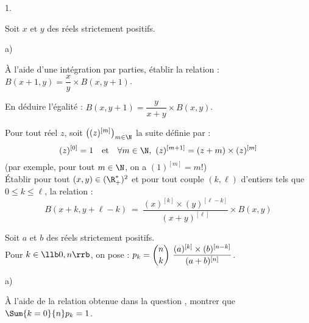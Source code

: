 \documentclass[11pt]{article}%
\begin{document}




\begin{noliste}{1.}
  \setlength{\itemsep}{4mm} %
  \setcounter{enumi}{4}
\item Soit $x$ et $y$ des réels strictement positifs.
  \begin{noliste}{a)}
    \setlength{\itemsep}{2mm}
  \item À l'aide d'une intégration par parties, établir la relation :
    $B(x+1,y) = \dfrac{x}{y} \times B(x,y+1)$.
    
    




  \item En déduire l'égalité : $B(x,y+1) = \dfrac{y}{x+y} \times
    B(x,y)$.

    

  \end{noliste}
  
\item Pour tout réel $z$, soit $\left( (z)^{[m]} \right)_{m \in \N}$
  la suite définie par :
  \[
  (z)^{[0]}=1 \quad \text{et} \quad \forall m \in \N, \ 
  (z)^{[m+1]}=(z+m)   \times (z)^{[m]}
  \]
  (par exemple, pour tout $m \in \N$, on a $(1)^{[m]}=m!$)\\[.1cm]
  Établir pour tout $(x,y) \in (\R_+^*)^2$ et pour tout 
  couple $(k, \ell)$ d'entiers tels que $0 \leq k \leq \ell$, la 
  relation :
  \[
  B(x+k, y+\ell-k) \ = \ \dfrac{(x)^{[k]} \times (y)^{[\ell-k]}}{(x +
    y)^{[\ell]}} \times B(x,y)
  \]
  
  
  
\item Soit $a$ et $b$ des réels strictement positifs.\\[.2cm]
  Pour $k \in \llb 0,n \rrb$, on pose : $p_k = \dbinom{n}{k} \
  \dfrac{(a)^{[k]} \times (b)^{[n-k]}}{(a+b)^{[n]}}$.




  \begin{noliste}{a)}
    \setlength{\itemsep}{2mm}
  \item À l'aide de la relation obtenue dans la question ,
    montrer que $\Sum{k=0}{n} p_k = 1$.
    
    
    
  \end{noliste}
  

\end{noliste}
\end{document}
